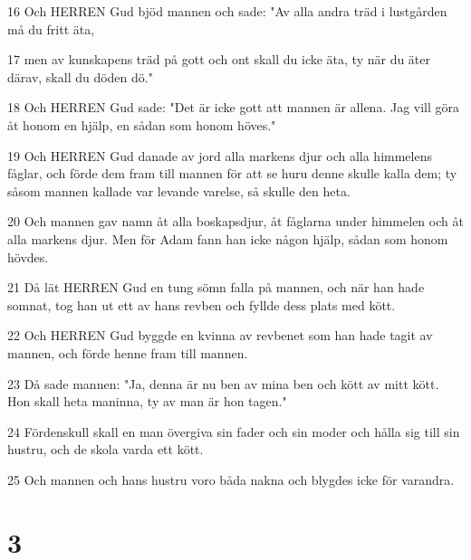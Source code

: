 \par 16 Och HERREN Gud bjöd mannen och sade: "Av alla andra träd i lustgården må du fritt äta,
\par 17 men av kunskapens träd på gott och ont skall du icke äta, ty när du äter därav, skall du döden dö."
\par 18 Och HERREN Gud sade: "Det är icke gott att mannen är allena. Jag vill göra åt honom en hjälp, en sådan som honom höves."
\par 19 Och HERREN Gud danade av jord alla markens djur och alla himmelens fåglar, och förde dem fram till mannen för att se huru denne skulle kalla dem; ty såsom mannen kallade var levande varelse, så skulle den heta.
\par 20 Och mannen gav namn åt alla boskapsdjur, åt fåglarna under himmelen och åt alla markens djur. Men för Adam fann han icke någon hjälp, sådan som honom hövdes.
\par 21 Då lät HERREN Gud en tung sömn falla på mannen, och när han hade somnat, tog han ut ett av hans revben och fyllde dess plats med kött.
\par 22 Och HERREN Gud byggde en kvinna av revbenet som han hade tagit av mannen, och förde henne fram till mannen.
\par 23 Då sade mannen: "Ja, denna är nu ben av mina ben och kött av mitt kött. Hon skall heta maninna, ty av man är hon tagen."
\par 24 Fördenskull skall en man övergiva sin fader och sin moder och hålla sig till sin hustru, och de skola varda ett kött.
\par 25 Och mannen och hans hustru voro båda nakna och blygdes icke för varandra.

\chapter{3}


